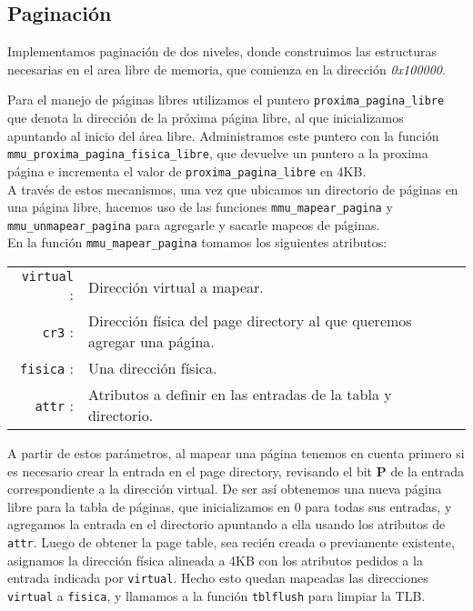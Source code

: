 \subsection{Paginación}
\label{sec-paginacion} 

Implementamos paginación de dos niveles, donde construimos las estructuras necesarias en  el area libre de memoria, que comienza en la dirección \textit{0x100000}.

Para el manejo de páginas libres utilizamos el puntero \verb|proxima_pagina_libre| que denota la dirección de la próxima página libre, al que inicializamos apuntando al inicio del área libre.
Administramos este puntero con la función \verb|mmu_proxima_pagina_fisica_libre|, que devuelve un puntero a la proxima página e incrementa el valor de \verb|proxima_pagina_libre| en 4KB.\\

A través de estos mecanismos, una vez que ubicamos un directorio de páginas en una página libre, hacemos uso de las funciones \verb|mmu_mapear_pagina| y \verb|mmu_unmapear_pagina| para agregarle y sacarle mapeos de páginas.\\

En la función \verb|mmu_mapear_pagina| tomamos los siguientes atributos:


\begin{center}
	\begin{tabular}{r p{} }
		\verb|virtual| : & Dirección virtual a mapear. \\
		\verb|cr3| : & Dirección física del page directory al que queremos agregar una página.\\
		\verb|fisica| : & Una dirección física. \\
		\verb|attr| : & Atributos a definir en las entradas de la tabla y directorio.\\
	\end{tabular}
\end{center}
\vspace{10pt}


A partir de estos parámetros, al mapear una página tenemos en cuenta primero si es necesario crear la entrada en el page directory, revisando el bit \textbf{P} de la entrada correspondiente a la dirección virtual.
De ser así obtenemos una nueva página libre para la tabla de páginas, que inicializamos en 0 para todas sus entradas, y agregamos la entrada en el directorio apuntando a ella usando los atributos de \verb|attr|.
Luego de obtener la page table, sea recién creada o previamente existente, asignamos la dirección física alineada a 4KB con los atributos pedidos a la entrada indicada por \verb|virtual|.
Hecho esto quedan mapeadas las direcciones \verb|virtual| a \verb|fisica|, y llamamos a la función \verb|tblflush| para limpiar la TLB.\\


